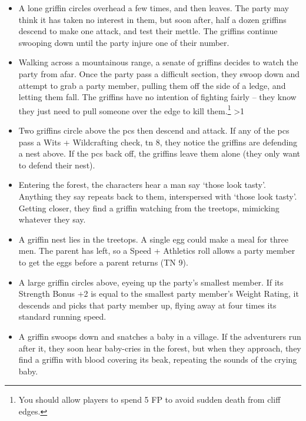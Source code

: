 \begin{multicols}{2}
\begin{itemize}
  \item
  A lone griffin circles overhead a few times, and then leaves.
  The party may think it has taken no interest in them, but soon after, half a dozen griffins descend to make one attack, and test their mettle.
  The griffins continue swooping down until the party injure one of their number.
  \item
  Walking across a mountainous range, a senate of griffins decides to watch the party from afar.
  Once the party pass a difficult section, they swoop down and attempt to grab a party member, pulling them off the side of a ledge, and letting them fall.
  The griffins have no intention of fighting fairly -- they know they just need to pull someone over the edge to kill them.\footnote{You should allow players to spend 5 FP to avoid sudden death from cliff edges.}
  \ifnum\value{temperature}>1
    \item
    Two griffins circle above the \glspl{pc} then descend and attack.
    If any of the \glspl{pc} pass a Wits + Wildcrafting check, \gls{tn} 8, they notice the griffins are defending a nest above.
    If the \glspl{pc} back off, the griffins leave them alone (they only want to defend their nest).
  \else
    \item
    Entering the forest, the characters hear a man say `those look tasty'.
    Anything they say repeats back to them, interspersed with `those look tasty'.
    Getting closer, they find a griffin watching from the treetops, mimicking whatever they say.
  \fi
  \item
  A griffin nest lies in the treetops.
  A single egg could make a meal for three men.
  The parent has left, so a Speed + Athletics roll allows a party member to get the eggs before a parent returns (TN 9).
  \item
  A large griffin circles above, eyeing up the party's smallest member.
  If its Strength Bonus +2 is equal to the smallest party member's Weight Rating, it descends and picks that party member up, flying away at four times its standard running speed.
  \item
  A griffin swoops down and snatches a baby in a village.
  If the adventurers run after it, they soon hear baby-cries in the forest, but when they approach, they find a griffin with blood covering its beak, repeating the sounds of the crying baby.

\end{itemize}

\label{mouthdigger}


\end{multicols}
